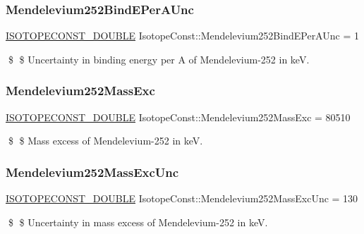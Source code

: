 \subsubsection{\texorpdfstring{Mendelevium252\+Bind\+E\+Per\+A\+Unc}{Mendelevium252BindEPerAUnc}}
{\footnotesize\ttfamily \mbox{\hyperlink{group___isotope_const-_macros_ga8f45a7272ce02c0b4c65c44636ed719a}{I\+S\+O\+T\+O\+P\+E\+C\+O\+N\+S\+T\+\_\+\+D\+O\+U\+B\+LE}} Isotope\+Const\+::\+Mendelevium252\+Bind\+E\+Per\+A\+Unc = 1}

\$ \$ Uncertainty in binding energy per A of Mendelevium-\/252 in keV. \mbox{\label{group___isotope_const-_mendelevium-_md252_ga8b8c675839e2bd9d7ded776eb85e6892}} 
\subsubsection{\texorpdfstring{Mendelevium252\+Mass\+Exc}{Mendelevium252MassExc}}
{\footnotesize\ttfamily \mbox{\hyperlink{group___isotope_const-_macros_ga8f45a7272ce02c0b4c65c44636ed719a}{I\+S\+O\+T\+O\+P\+E\+C\+O\+N\+S\+T\+\_\+\+D\+O\+U\+B\+LE}} Isotope\+Const\+::\+Mendelevium252\+Mass\+Exc = 80510}

\$ \$ Mass excess of Mendelevium-\/252 in keV. \mbox{\label{group___isotope_const-_mendelevium-_md252_gaea504e12c44d8fc1a9fe2be97d6c0cc4}} 
\subsubsection{\texorpdfstring{Mendelevium252\+Mass\+Exc\+Unc}{Mendelevium252MassExcUnc}}
{\footnotesize\ttfamily \mbox{\hyperlink{group___isotope_const-_macros_ga8f45a7272ce02c0b4c65c44636ed719a}{I\+S\+O\+T\+O\+P\+E\+C\+O\+N\+S\+T\+\_\+\+D\+O\+U\+B\+LE}} Isotope\+Const\+::\+Mendelevium252\+Mass\+Exc\+Unc = 130}

\$ \$ Uncertainty in mass excess of Mendelevium-\/252 in keV. \mbox{\label{group___isotope_const-_mendelevium-_md252_ga45c80ffbb72beff9a03b44bdcf385572}} 
